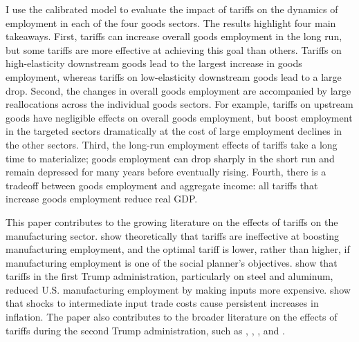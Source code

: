 \documentclass[12pt]{article}
\begin{document}

I use the calibrated model to evaluate the impact of tariffs on the dynamics of employment in each of the four goods sectors. The results highlight four main takeaways. First, tariffs can increase overall goods employment in the long run, but some tariffs are more effective at achieving this goal than others. Tariffs on high-elasticity downstream goods lead to the largest increase in goods employment, whereas tariffs on low-elasticity downstream goods lead to a large drop. Second, the changes in overall goods employment are accompanied by large reallocations across the individual goods sectors. For example, tariffs on upstream goods have negligible effects on overall goods employment, but boost employment in the targeted sectors dramatically at the cost of large employment declines in the other sectors. Third, the long-run employment effects of tariffs take a long time to materialize; goods employment can drop sharply in the short run and remain depressed for many years before eventually rising. Fourth, there is a tradeoff between goods employment and aggregate income: all tariffs that increase goods employment reduce real GDP.

This paper contributes to the growing literature on the effects of tariffs on the manufacturing sector. \citet{itskhoki-mukhin} show theoretically that tariffs are ineffective at boosting manufacturing employment, and the optimal tariff is lower, rather than higher, if manufacturing employment is one of the social planner's objectives. \citet{flaaen-pierce} show that tariffs in the first Trump administration, particularly on steel and aluminum, reduced U.S. manufacturing employment by making inputs more expensive. \citet{cuba-borda2025trade} show that shocks to intermediate input trade costs cause persistent increases in inflation. The paper also contributes to the broader literature on the effects of tariffs during the second Trump administration, such as \citet{IGNATENKO2025104138}, \citet{pau-jack}, \citet{cavallo2025tracking}, and \citet{taxcut}.
\end{document}
